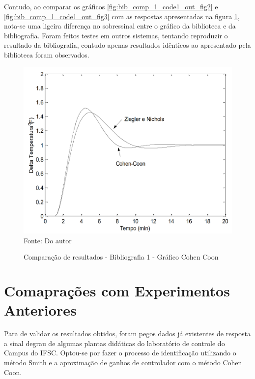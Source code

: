 Contudo, ao comparar os gráficos \ref{fig:bib_comp_1_code1_out_fig2} e \ref{fig:bib_comp_1_code1_out_fig3} com as
respostas apresentadas na figura \ref{fig:bib_comp_1_ctrl_fig},
nota-se uma ligeira diferença no sobressinal entre o gráfico da biblioteca e da bibliografia.
Foram feitos testes em outros sistemas, tentando reproduzir o resultado da bibliografia, contudo apenas resultados
idênticos ao apresentado pela biblioteca foram observados.

\begin{figure}[H]
    \centering
    \caption{Comparação de resultados - Bibliografia 1 - Gráfico Cohen Coon}
    \includegraphics[scale=0.4]{figuras/bib_comp_1_ctrl_fig}
    \label{fig:bib_comp_1_ctrl_fig}
    \\
    \vspace{0cm}\hspace{0cm}\small{Fonte: Do autor}
\end{figure}


\section{Comaprações com Experimentos Anteriores}

Para de validar os resultados obtidos, foram pegos dados já existentes de resposta a sinal degrau de algumas plantas
didáticas do laboratório de controle do Campus do IFSC.
Optou-se por fazer o processo de identificação utilizando o método Smith e a aproximação de ganhos de controlador
com o método Cohen Coon.

